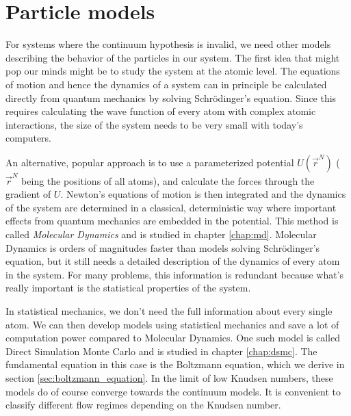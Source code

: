 \section{Particle models}
\label{sec:theory_of_fluids_atomic_models}
For systems where the continuum hypothesis is invalid, we need other models describing the behavior of the particles in our system. The first idea that might pop our minds might be to study the system at the atomic level. The equations of motion and hence the dynamics of a system can in principle be calculated directly from quantum mechanics by solving Schr\"{o}dinger's equation. Since this requires calculating the wave function of every atom with complex atomic interactions, the size of the system needs to be very small with today's computers.

An alternative, popular approach is to use a parameterized potential $U(\vec r^N)$ ($\vec r^N$ being the positions of all atoms), and calculate the forces through the gradient of $U$. Newton's equations of motion is then integrated and the dynamics of the system are determined in a classical, deterministic way where important effects from quantum mechanics are embedded in the potential. This method is called \textit{Molecular Dynamics} and is studied in chapter \ref{chap:md}. Molecular Dynamics is orders of magnitudes faster than models solving Schr\"{o}dinger's equation, but it still needs a detailed description of the dynamics of every atom in the system. For many problems, this information is redundant because what's really important is the statistical properties of the system. 

In statistical mechanics, we don't need the full information about every single atom. We can then develop models using statistical mechanics and save a lot of computation power compared to Molecular Dynamics. One such model is called Direct Simulation Monte Carlo and is studied in chapter \ref{chap:dsmc}. The fundamental equation in this case is the Boltzmann equation, which we derive in section \ref{sec:boltzmann_equation}. In the limit of low Knudsen numbers, these models do of course converge towards the continuum models. It is convenient to classify different flow regimes depending on the Knudsen number.
